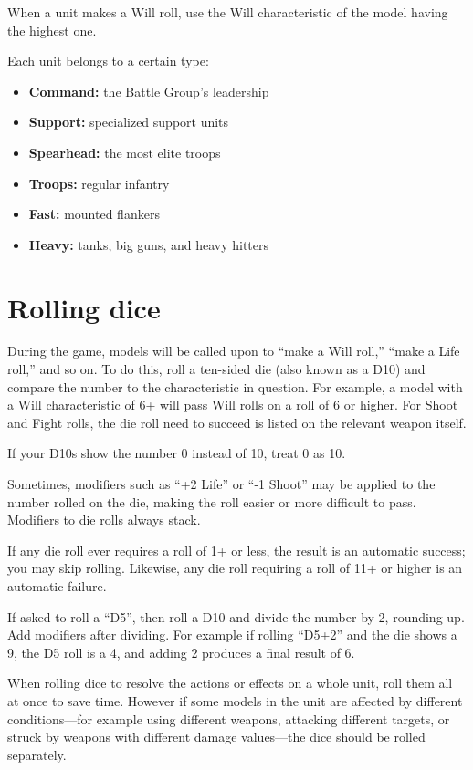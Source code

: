 \begin{multicols}{2}
When a unit makes a Will roll, use the Will characteristic of the model having the highest one.

Each unit belongs to a certain type:

\begin{itemize}
    \item \textbf{Command:} the Battle Group's leadership
    \item \textbf{Support:} specialized support units
    \item \textbf{Spearhead:} the most elite troops
    \item \textbf{Troops:} regular infantry
    \item \textbf{Fast:} mounted flankers
    \item \textbf{Heavy:} tanks, big guns, and heavy hitters
\end{itemize}




\section*{Rolling dice}

During the game, models will be called upon to ``make a Will roll,'' ``make a Life roll,'' and so on. To do this, roll a ten-sided die (also known as a D10) and compare the number to the characteristic in question. For example, a model with a Will characteristic of 6+ will pass Will rolls on a roll of 6 or higher. For Shoot and Fight rolls, the die roll need to succeed is listed on the relevant weapon itself.

If your D10s show the number 0 instead of 10, treat 0 as 10.

Sometimes, modifiers such as ``+2 Life'' or ``-1 Shoot'' may be applied to the number rolled on the die, making the roll easier or more difficult to pass. Modifiers to die rolls always stack.

If any die roll ever requires a roll of 1+ or less, the result is an automatic success; you may skip rolling. Likewise, any die roll requiring a roll of 11+ or higher is an automatic failure.

If asked to roll a ``D5'', then roll a D10 and divide the number by 2, rounding up. Add modifiers after dividing. For example if rolling ``D5+2'' and the die shows a 9, the D5 roll is a 4, and adding 2 produces a final result of 6.

When rolling dice to resolve the actions or effects on a whole unit, roll them all at once to save time. However if some models in the unit are affected by different conditions—for example using different weapons, attacking different targets, or struck by weapons with different damage values—the dice should be rolled separately.





\end{multicols}
